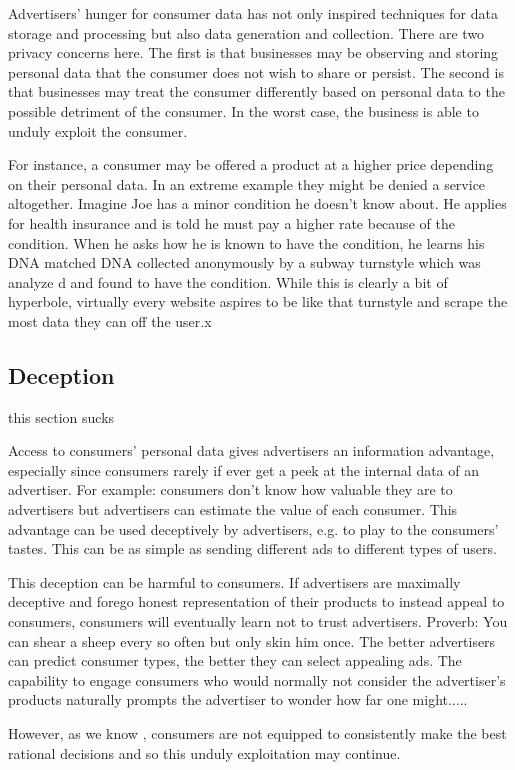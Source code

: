 \documentclass{article}
\begin{document}
Advertisers' hunger for consumer data has not only inspired techniques for data storage and processing but also data generation and collection. There are two privacy concerns here. The first is that businesses may be observing and storing personal data that the consumer does not wish to share or persist. The second is that businesses may treat the consumer differently based on personal data to the possible detriment of the consumer. In the worst case, the business is able to unduly exploit the consumer.

For instance, a consumer may be offered a product at a higher price depending on their personal data. In an extreme example they might be denied a service altogether. Imagine Joe has a minor condition he doesn't know about. He applies for health insurance and is told he must pay a higher rate because of the condition. When he asks how he is known to have the condition, he learns his DNA matched DNA collected anonymously by a subway turnstyle which was analyze d and found to have the condition. While this is clearly a bit of hyperbole, virtually every website aspires to be like that turnstyle and scrape the most data they can off the user.x

\subsection{Deception}
this section sucks

Access to consumers' personal data gives advertisers an information advantage, especially since consumers rarely if ever get a peek at the internal data of an advertiser. For example: consumers don't know how valuable they are to advertisers but advertisers can estimate the value of each consumer. This advantage can be used deceptively by advertisers, e.g. to play to the consumers' tastes. This can be as simple as sending different ads to different types of users.

This deception can be harmful to consumers. If advertisers are maximally deceptive and forego honest representation of their products to instead appeal to consumers, consumers will eventually learn not to trust advertisers. Proverb: You can shear a sheep every so often but only skin him once. The better advertisers can predict consumer types, the better they can select appealing ads. The capability to engage consumers who would normally not consider the advertiser's products naturally prompts the advertiser to wonder how far one might.....

However, as we know \cite{phishing for phools}, consumers are not equipped to consistently make the best rational decisions and so this unduly exploitation may continue.
\end{document}

